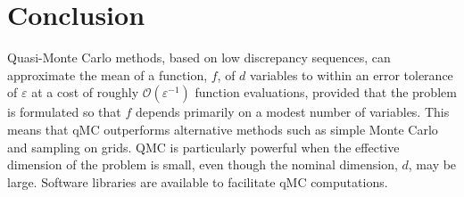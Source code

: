 \documentclass{svproc}
\begin{document}
\section{Conclusion} \label{sec:conclusion}
Quasi-Monte Carlo methods, based on low discrepancy sequences, can approximate the mean of a function, $f$, of $d$ variables to within an error tolerance of $\varepsilon$ at a cost of roughly $\mathcal{O}(\varepsilon^{-1})$ function evaluations, provided that the problem is formulated so that $f$ depends primarily on a modest number of variables.  This means that qMC outperforms alternative methods such as simple Monte Carlo and sampling on grids.  QMC is particularly powerful when the effective dimension of the problem is small, even though the nominal dimension, $d$, may be large.  Software libraries are available to facilitate qMC computations.




\end{document}
